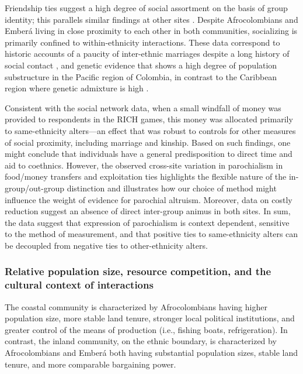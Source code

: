 \documentclass[bibauthoryear]{aa}
\begin{document}
Friendship ties suggest a high degree of social assortment on the basis of group identity; this parallels similar findings at other sites \cite[e.g.,][]{power2017social, baerveldt2007ethnic}. Despite Afrocolombians and Ember\'a living in close proximity to each other in both communities, socializing is primarily confined to within-ethnicity interactions. These data correspond to historic accounts of a paucity of inter-ethnic marriages despite a long history of social contact \citep{Cay73}, and genetic evidence that shows a high degree of population substructure in the Pacific region of Colombia, in contrast to the Caribbean region where genetic admixture is high \citep{ossa2016outlining}.

Consistent with the social network data, when a small windfall of money was provided to respondents in the RICH games, this money was allocated primarily to same-ethnicity alters---an effect that was robust to controls for other measures of social proximity, including marriage and kinship. Based on such findings, one might conclude that individuals have a general predisposition to direct time and aid to coethnics.  However, the observed cross-site variation in parochialism in food/money transfers and exploitation ties highlights the flexible nature of the in-group/out-group distinction and illustrates how our choice of method might influence the weight of evidence for parochial altruism. Moreover, data on costly reduction suggest an absence of direct inter-group animus in both sites. In sum, the data suggest that expression of parochialism is context dependent, sensitive to the method of measurement, and that positive ties to same-ethnicity alters can be decoupled from negative ties to other-ethnicity alters.

\subsubsection{Relative population size, resource competition, and the cultural context of interactions}
\label{contextcc}
The coastal community is characterized by Afrocolombians having higher population size, more stable land tenure,  stronger local political institutions, and greater control of the means of production (i.e., fishing boats, refrigeration). In contrast, the inland community, on the ethnic boundary, is characterized by Afrocolombians and Ember\'a both having substantial population sizes, stable land tenure, and more comparable bargaining power. 
\end{document}
